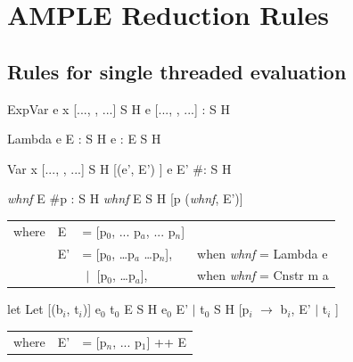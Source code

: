 \documentclass{llncs}
\begin{document}




\clearpage
\appendix{}

\section{AMPLE Reduction Rules}

\subsection{Rules for single threaded evaluation}

	{ExpVar e x}	{[..., \px, ...]}	{S}		{H}
	{e}		{[..., \px, ...]}	{\px : S}	{H}
\medskip


	{Lambda e}	{E}			{\px : S}	{H}
	{e}		{\px : E}		{S}		{H}
\medskip


	{Var x}		{[..., \px, ...]}	{S}		{H [\px \bind (e', E') ]}
	{e}		{E'}			{\#{}\px : S}	{H}
\medskip	

        {\emph{whnf}}	{E}			{\#{}p : S}	{H}
	{\emph{whnf}}	{E}			{S}		{H [p \bind (\emph{whnf}, E')]}

\begin{tabular}{p{10mm}p{5mm}p{35mm}l}
	where	& E		& = [p$_0$, ... p$_a$, ... p$_n$] &
	\smallskip \\
		& E'		&    =    [p$_0$, \ldots p$_a$ \ldots p$_n$],	& when \emph{whnf} = Lambda e \\
		&               & $\;|\;$ [p$_0$, \ldots p$_a$],		& when \emph{whnf} = Cnstr m a \\
\end{tabular}
\medskip
	
\rruleCfSE 
	{let}
	{Let [(b$_i$, t$_i$)] e$_0$ t$_0$}
	{E} 
	{S}
	{H}
	{e$_0$}	
	{E' $|$ t$_0$}
	{S}
	{H [p$_i$ $\rightarrow$ b$_i$, E' $|$ t$_i$ ]}	
\smallskip

\begin{tabular}{p{10mm}ll}
	where	& E'	& = [p$_n$, ... p$_1$] ++ E
\end{tabular}
\medskip
\end{document}

